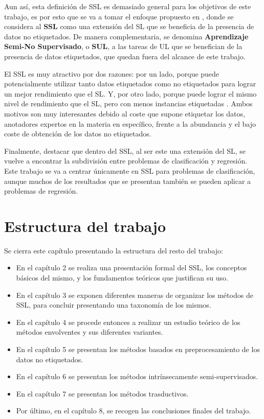 Aun así, esta definición de \gls{SSL} es demasiado general para los objetivos de este trabajo, es por esto que se va a tomar el enfoque propuesto en \citet{seeger2006taxonomy}, donde se considera al \textbf{\gls{SSL}} como una extensión del \gls{SL} que se beneficia de la presencia de datos no etiquetados. De manera complementaria, se denomina \textbf{Aprendizaje Semi-No Supervisado}, o \textbf{\gls{SUL}}, a las tareas de \gls{UL} que se benefician de la presencia de datos etiquetados, que quedan fuera del alcance de este trabajo.

El \gls{SSL} es muy atractivo por dos razones: por un lado, porque puede potencialmente utilizar tanto datos etiquetados como no etiquetados para lograr un mejor rendimiento que el \gls{SL}. Y, por otro lado, porque puede lograr el mismo nivel de rendimiento que el \gls{SL}, pero con menos instancias etiquetadas \cite{zhu2009introduction}. Ambos motivos son muy interesantes debido al coste que supone etiquetar los datos, anotadores expertos en la materia en específico, frente a la abundancia y el bajo coste de obtención de los datos no etiquetados. 

Finalmente, destacar que dentro del \gls{SSL}, al ser este una extensión del \gls{SL}, se vuelve a encontrar la subdivisión entre problemas de clasificación y regresión. Este trabajo se va a centrar únicamente en \gls{SSL} para problemas de clasificación, aunque muchos de los resultados que se presentan también se pueden aplicar a problemas de regresión.

\section{Estructura del trabajo}
\label{sec:estructura}

Se cierra este capítulo presentando la estructura del resto del trabajo: 

\begin{itemize}
    \item En el capítulo 2 se realiza una presentación formal del \gls{SSL}, los conceptos básicos del mismo, y los fundamentos teóricos que justifican su uso.
    \item En el capítulo 3 se exponen diferentes maneras de organizar los métodos de \gls{SSL}, para concluir presentando una taxonomía de los mismos.
    \item En el capítulo 4 se procede entonces a realizar un estudio teórico de los métodos envolventes y sus diferentes variantes.
    \item En el capítulo 5 se presentan los métodos basados en preprocesamiento de los datos no etiquetados.
    \item En el capítulo 6 se presentan los métodos intrínsecamente semi-supervisados.
    \item En el capítulo 7 se presentan los métodos trasductivos. 
    \item Por último, en el capítulo 8, se recogen las conclusiones finales del trabajo.
\end{itemize}